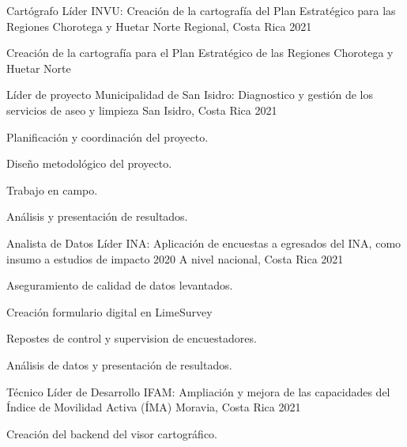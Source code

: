 \begin{cventries}
{\begin{cvitems}
  \end{cvitems}
}
\cventry
{Cartógrafo Líder} %
{INVU: Creación de la cartografía del Plan Estratégico para las Regiones Chorotega y Huetar
Norte} %
{Regional, Costa Rica} %
{2021} %
{
  \begin{cvitems} %
    \item Creación de la cartografía para el Plan Estratégico de las Regiones Chorotega y Huetar Norte
  \end{cvitems}
}
\cventry
{Líder de proyecto} %
{Municipalidad de San Isidro: Diagnostico y gestión de los servicios de aseo y limpieza} %
{San Isidro, Costa Rica} %
{2021} %
{
  \begin{cvitems} %
    \item Planificación y coordinación del proyecto.
    \item Diseño metodológico del proyecto.
    \item Trabajo en campo.
    \item Análisis y presentación de resultados.
  \end{cvitems}
}
\cventry
{Analista de Datos Líder} %
{INA: Aplicación de encuestas a egresados del INA, como insumo a estudios de impacto 2020} %
{A nivel nacional, Costa Rica} %
{2021} %
{
  \begin{cvitems} %
    \item Aseguramiento de calidad de datos levantados.
    \item Creación formulario digital en LimeSurvey
    \item Repostes de control y supervision de encuestadores.
    \item Análisis de datos y presentación de resultados.
  \end{cvitems}
}
\cventry
{Técnico Líder de Desarrollo} %
{IFAM: Ampliación y mejora de las capacidades del Índice de Movilidad Activa (ÍMA)} %
{Moravia, Costa Rica} %
{2021} %
{
  \begin{cvitems} %
    \item Creación del backend del visor cartográfico.

\end{cvitems}}
\end{cventries}
